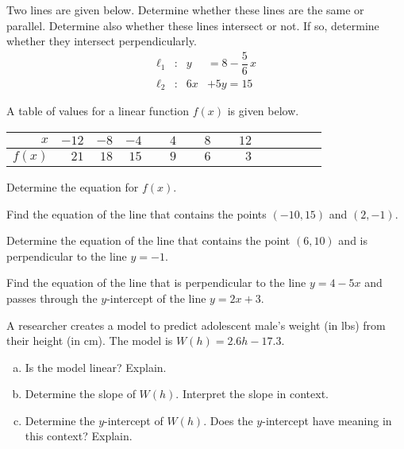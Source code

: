 \documentclass[12pt,letterpaper]{exam}
\begin{document}
\begin{questions}
\newpage



\newpage
\question[6] Two lines are given below. Determine whether these lines are the same or parallel. Determine also whether these lines intersect or not. If so, determine whether they intersect perpendicularly. 
	\[
	\begin{aligned}
	\ell_1&: & y&= 8 - \dfrac{5}{6}\,x \\
	\ell_2&: & 6x &+ 5y= 15
	\end{aligned}
	\] \pspace



\newpage



\newpage
\question[6] A table of values for a linear function $f(x)$ is given below.
	\begin{table}[!ht]
	\centering
	\begin{tabular}{r||rrrrrrrrrrr}
	$x$ & $-12$ & $-8$ & $-4$ & $\phantom{-}4$ & $\phantom{-}8$ & $\phantom{-}12$ \\ \hline
	$f(x)$ & $21$ & $18$ & $15$ & $9$ & $6$ & $3$
	\end{tabular}
	\end{table} \par
Determine the equation for $f(x)$. \pspace



\newpage



\newpage
\question[6] Find the equation of the line that contains the points $(-10, 15)$ and $(2, -1)$. \pspace



\newpage



\newpage
\question[6] Determine the equation of the line that contains the point $(6, 10)$ and is perpendicular to the line $y= -1$. \pspace 



\newpage



\newpage
\question[6] Find the equation of the line that is perpendicular to the line $y= 4 - 5x$ and passes through the $y$-intercept of the line $y= 2x + 3$. \pspace



\newpage



\newpage
\question[6] A researcher creates a model to predict adolescent male's weight (in lbs) from their height (in cm). The model is $W(h)= 2.6h - 17.3$.
	\begin{enumerate}[(a)]
	\item Is the model linear? Explain.
	\item Determine the slope of $W(h)$. Interpret the slope in context.
	\item Determine the $y$-intercept of $W(h)$. Does the $y$-intercept have meaning in this context? Explain.
	\end{enumerate} \pspace




\end{questions}
\end{document}
